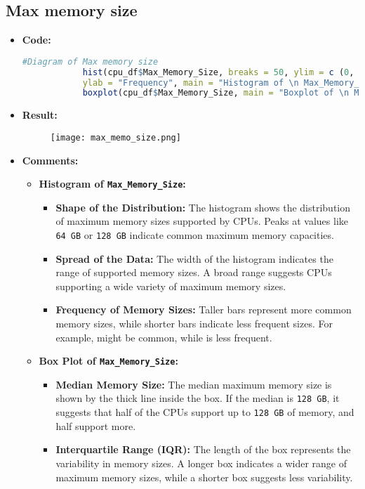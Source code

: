 \documentclass{article}
\begin{document}
	\subsection{Max memory size}
	\begin{itemize}
		\item \textbf{Code:}
		\begin{lstlisting}[basicstyle=\ttfamily, frame=single,language=R]
			#Diagram of Max memory size
			hist(cpu_df$Max_Memory_Size, breaks = 50, ylim = c (0, 1000), xlab = "Byte", 
			ylab = "Frequency", main = "Histogram of \n Max_Memory_Size")
			boxplot(cpu_df$Max_Memory_Size, main = "Boxplot of \n Max_Memory_Size")
		\end{lstlisting}
		\item \textbf{Result:}
		\begin{figure}[h]
			\centering
			\texttt{[image: max\_memo\_size.png]} %
			\label{fig:enter-label}
		\end{figure}
		\item \textbf{Comments:}
		\begin{itemize}
			\item \textbf{Histogram of \texttt{Max\_Memory\_Size}:}
			\begin{itemize}
				\item \textbf{Shape of the Distribution:} The histogram shows the distribution of maximum memory sizes supported by CPUs. Peaks at values like \texttt{64 GB} or \texttt{128 GB} indicate common maximum memory capacities.
				\item \textbf{Spread of the Data:} The width of the histogram indicates the range of supported memory sizes. A broad range suggests CPUs supporting a wide variety of maximum memory sizes.
				\item \textbf{Frequency of Memory Sizes:} Taller bars represent more common memory sizes, while shorter bars indicate less frequent sizes. For example,  might be common, while  is less frequent.
			\end{itemize}
			\item \textbf{Box Plot of \texttt{Max\_Memory\_Size}:}
			\begin{itemize}
				\item \textbf{Median Memory Size:} The median maximum memory size is shown by the thick line inside the box. If the median is \texttt{128 GB}, it suggests that half of the CPUs support up to \texttt{128 GB} of memory, and half support more.
				\item \textbf{Interquartile Range (IQR):} The length of the box represents the variability in memory sizes. A longer box indicates a wider range of maximum memory sizes, while a shorter box suggests less variability.

\end{itemize}
\end{itemize}
\end{itemize}
\end{document}
